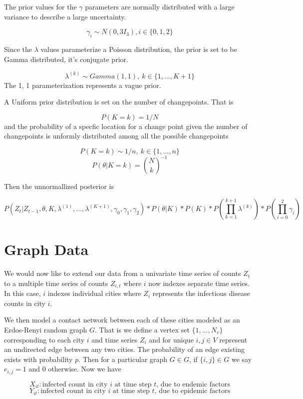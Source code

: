 \documentclass[]{article}
\numberwithin{equation}{section}
\begin{document}
The prior values for the \(\gamma\) parameters are normally distributed
with a large variance to describe a large uncertainty.

\[\gamma_i \sim N(0, 3I_3), i \in \{0,1,2\}\]

Since the \(\lambda\) values parameterize a Poisson distribution, the
prior is set to be Gamma distributed, it's conjugate prior.

\[ \lambda^{(k)} \sim Gamma(1, 1),\ k \in \{1, \dots, K + 1\} \] The 1,
1 parameterization represents a vague prior.

A Uniform prior distribution is set on the number of changepoints. That
is

\[P(K = k) = 1/N\] and the probability of a specfic location for a
change point given the number of changepoints is unformly distributed
among all the possible changepoints

\[P(K = k) \sim 1/n,\ k \in \{1,\dots,n\}\]
\[P(\theta|K=k) = \binom{N}{k}^{-1}\]

Then the unnormallized posterior is

\[ P(Z_t|Z_{t-1},\theta, K, \lambda^{(1)}, \dots, \lambda^{(K+1)}, \gamma_0, \gamma_1, \gamma_2)*P(\theta|K)*P(K)*P(\prod_{k=1}^{k+1}\lambda^{(k)} )*P(\prod_{i=0}^2 \gamma_i)  \]

\hypertarget{graph-data}{%
\section{Graph Data}\label{graph-data}}

We would now like to extend our data from a univariate time series of
counts \(Z_t\) to a multiple time series of counts \(Z_{i,t}\) where
\(i\) now indexes separate time series. In this case, \(i\) indexes
individual cities where \(Z_i\) represents the infectious disease counts
in city \(i\).

We then model a contact network between each of these cities modeled as
an Erdos-Renyi random graph \(G\). That is we define a vertex set
\(\{1, \dots, N_v\}\) corresponding to each city \(i\) and time series
\(Z_i\) and for unique \(i, j \in V\) represent an undirected edge
between any two cities. The probability of an edge existing exists with
probability \(p\). Then for a particular graph \(G \in G\), if
\(\{i,j\} \in G\) we say \(e_{i,j} = 1\) and \(0\) otherwise. Now we
have

\[X_{it}: \text{infected count in city } i \text{ at time step } t \text{, due to endemic factors}   \]
\[Y_{it} : \text{infected count in city } i \text{ at time step } t \text{, due to epidemic factors}   \]
\end{document}
